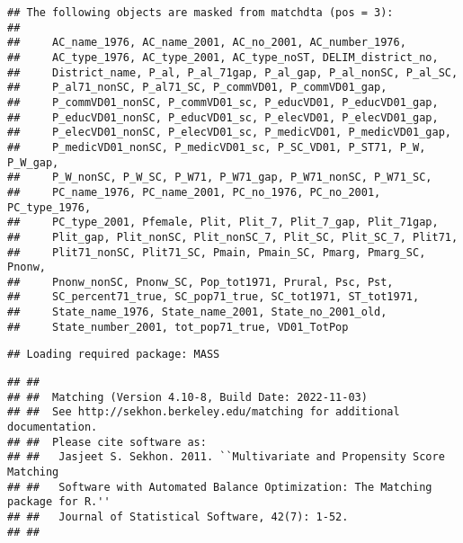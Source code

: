 \documentclass[
]{article}
\begin{document}
\begin{verbatim}
## The following objects are masked from matchdta (pos = 3):
## 
##     AC_name_1976, AC_name_2001, AC_no_2001, AC_number_1976,
##     AC_type_1976, AC_type_2001, AC_type_noST, DELIM_district_no,
##     District_name, P_al, P_al_71gap, P_al_gap, P_al_nonSC, P_al_SC,
##     P_al71_nonSC, P_al71_SC, P_commVD01, P_commVD01_gap,
##     P_commVD01_nonSC, P_commVD01_sc, P_educVD01, P_educVD01_gap,
##     P_educVD01_nonSC, P_educVD01_sc, P_elecVD01, P_elecVD01_gap,
##     P_elecVD01_nonSC, P_elecVD01_sc, P_medicVD01, P_medicVD01_gap,
##     P_medicVD01_nonSC, P_medicVD01_sc, P_SC_VD01, P_ST71, P_W, P_W_gap,
##     P_W_nonSC, P_W_SC, P_W71, P_W71_gap, P_W71_nonSC, P_W71_SC,
##     PC_name_1976, PC_name_2001, PC_no_1976, PC_no_2001, PC_type_1976,
##     PC_type_2001, Pfemale, Plit, Plit_7, Plit_7_gap, Plit_71gap,
##     Plit_gap, Plit_nonSC, Plit_nonSC_7, Plit_SC, Plit_SC_7, Plit71,
##     Plit71_nonSC, Plit71_SC, Pmain, Pmain_SC, Pmarg, Pmarg_SC, Pnonw,
##     Pnonw_nonSC, Pnonw_SC, Pop_tot1971, Prural, Psc, Pst,
##     SC_percent71_true, SC_pop71_true, SC_tot1971, ST_tot1971,
##     State_name_1976, State_name_2001, State_no_2001_old,
##     State_number_2001, tot_pop71_true, VD01_TotPop
\end{verbatim}

\begin{verbatim}
## Loading required package: MASS
\end{verbatim}

\begin{verbatim}
## ## 
## ##  Matching (Version 4.10-8, Build Date: 2022-11-03)
## ##  See http://sekhon.berkeley.edu/matching for additional documentation.
## ##  Please cite software as:
## ##   Jasjeet S. Sekhon. 2011. ``Multivariate and Propensity Score Matching
## ##   Software with Automated Balance Optimization: The Matching package for R.''
## ##   Journal of Statistical Software, 42(7): 1-52. 
## ##
\end{verbatim}
\end{document}
